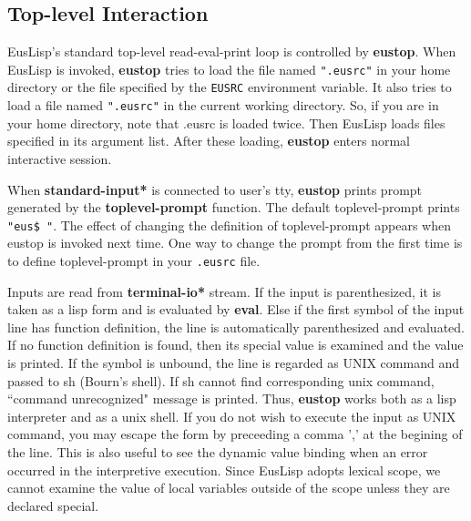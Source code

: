 \newpage

\subsection{Top-level Interaction}

EusLisp's standard top-level read-eval-print loop is controlled by {\bf eustop}.
When EusLisp is invoked,
{\bf eustop} tries to load the file named {\tt ".eusrc"} in your home directory
or the file specified by the {\tt EUSRC} environment variable.
It also tries to load a file named {\tt ".eusrc"} in the current working
directory.  So, if you are in your home directory, note that .eusrc is
loaded twice.
Then EusLisp loads files specified in its argument list.
After these loading, {\bf eustop} enters normal interactive session.

When {\bf *standard-input*} is connected to user's tty,
{\bf eustop} prints prompt generated by the {\bf toplevel-prompt} function.
The default toplevel-prompt prints {\tt "eus\$ "}.
The effect of changing the definition of toplevel-prompt appears
when eustop is invoked next time.
One way to change the prompt from the first time is to define
toplevel-prompt in your {\tt .eusrc} file.

Inputs are read from {\bf *terminal-io*} stream.
If the input is parenthesized, it is taken as a lisp form and
is evaluated by {\bf eval}.
Else if the first symbol of the input line has function definition,
the line is automatically parenthesized and evaluated.
If no function definition is found,
then its special value is examined and the value is printed.
If the symbol is unbound,
the line is regarded as UNIX command and passed to sh (Bourn's shell).
If sh cannot find corresponding unix command,
``command unrecognized" message is printed.
Thus, {\bf eustop} works both as a lisp interpreter and as a unix shell.
If you do not wish to execute the input as UNIX command,
you may escape the form by preceeding a comma ',' at the begining of the line.
This is also useful to see the dynamic value binding when
an error occurred in the interpretive execution.
Since EusLisp adopts lexical scope,
we cannot examine the value of local variables outside of the scope
unless they are declared special.

